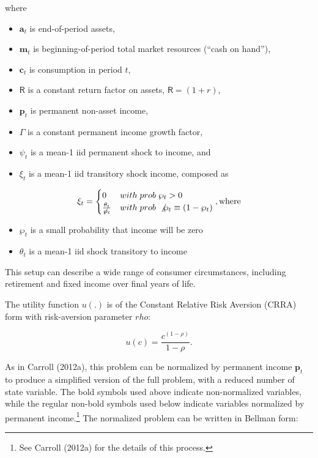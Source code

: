 \documentclass[]{article}
\begin{document}
where

\begin{itemize}
\itemsep1pt\parskip0pt
\item
  $\mathbf{a}_t$ is end-of-period assets,
\item
  $\mathbf{m}_t$ is beginning-of-period total market resources (``cash
  on hand''),
\item
  $\mathbf{c}_t$ is consumption in period $t$,
\item
  $\mathsf{R}$ is a constant return factor on assets,
  $\mathsf{R}=(1+r)$,
\item
  $\mathbf{p}_{t}$ is permanent non-asset income,
\item
  $\Gamma$ is a constant permanent income growth factor,
\item
  $\psi_{t}$ is a mean-1 iid permanent shock to income, and
\item
  $\xi_{t}$ is a mean-1 iid transitory shock income, composed as
\end{itemize}

\[\xi_{t}=\begin{cases}
0 & with\; prob\;\wp_t>0\\
\tfrac{\theta_{t}}{\not\wp_t} & with\; prob\;\not{\wp_t} \equiv(1-\wp_t)
\end{cases}, \textrm{where}\]

\begin{itemize}
\itemsep1pt\parskip0pt
\item
  $\wp_t$ is a small probability that income will be zero
\item
  $\theta_t$ is a mean-1 iid shock transitory to income
\end{itemize}

This setup can describe a wide range of consumer circumstances,
including retirement and fixed income over final years of life.

The utility function $u(.)$ is of the Constant Relative Risk Aversion
(CRRA) form with risk-aversion parameter $rho$:

\[u(c) = \frac{c^(1-\rho)}{1-\rho}.\]

As in Carroll (2012a), this problem can be normalized by permanent
income $\mathbf{p}_{t}$ to produce a simplified version of the full
problem, with a reduced number of state variable. The bold symbols used
above indicate non-normalized variables, while the regular non-bold
symbols used below indicate variables normalized by permanent
income.\footnote{See Carroll (2012a) for the details of this process.}
The normalized problem can be written in Bellman form:
\end{document}
